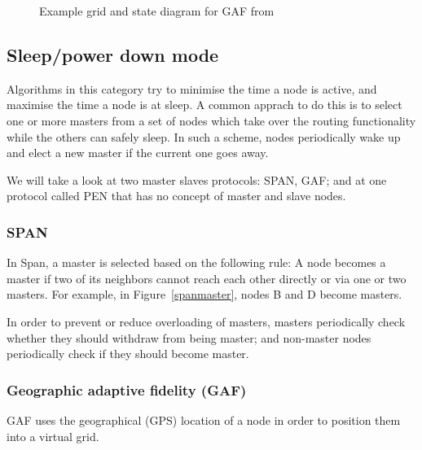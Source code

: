 \begin{figure}[!t]
\hfill
{}
\caption{Example grid and state diagram for GAF from \cite{alotaibi2012survey}}
\end{figure}
\subsection{Sleep/power­ down mode}
Algorithms in this category try to minimise the time a node is active, and
maximise the time a node is at sleep. A common apprach to do this is to select
one or more masters from a set of nodes which take over the routing functionality
while the others can safely sleep. In such a scheme, nodes periodically wake up
and elect a new master if the current one goes away.

We will take a look at two master slaves protocols: SPAN, GAF;
and at one protocol called PEN that has no concept of master and slave nodes.

\subsubsection{SPAN}\label{span}
In Span\cite{chen2002span}, a master is selected based on the following rule:
A node becomes a master if two of its neighbors cannot reach each other directly
or via one or two masters. For example, in Figure~\ref{spanmaster}, nodes B and
D become masters.

In order to prevent or reduce overloading of masters, masters periodically
check whether they should withdraw from being master; and non-master nodes
periodically check if they should become master.


\subsubsection{Geographic adaptive fidelity (GAF)}
\label{gaf}
GAF\cite{xu2001geography} uses the geographical (GPS) location of a node in
order to position them into a virtual grid.

